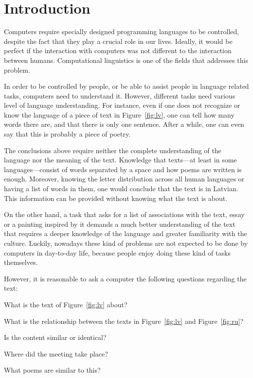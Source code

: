 \chapter{Introduction}
\label{ch:introduction}


Computers require specially designed programming languages to be controlled, despite the fact that they play a crucial role in our lives. Ideally, it would be perfect if the interaction with computers was not different to the interaction between humans. Computational linguistics is one of the fields that addresses this problem.

In order to be controlled by people, or be able to assist people in language related tasks, computers need to understand it. However, different tasks need various level of language understanding. For instance, even if one does not recognize or know the language of a piece of text in Figure~\ref{fig:lv}, one can tell how many words there are, and that there is only one sentence. After a while, one can even say that this is probably a piece of poetry.

The conclusions above require neither the complete understanding of the language nor the meaning of the text. Knowledge that texts---at least in some languages---consist of words separated by a space and how poems are written is enough. Moreover, knowing the letter distribution across all human languages or having a list of words in them, one would conclude that the text is in Latvian. This information can be provided without knowing what the text is about.



On the other hand, a task that asks for a list of associations with the text, essay or a painting inspired by it demands a much better understanding of the text that requires a deeper knowledge of the language and greater familiarity with the culture. Luckily, nowadays these kind of problems are not expected to be done by computers in day-to-day life, because people enjoy doing these kind of tasks themselves.

However, it is reasonable to ask a computer the following questions regarding the text:
\begin{inparaenum}[a)]
\item What is the text of Figure~\ref{fig:lv} about?
\item What is the relationship between the texts in Figure~\ref{fig:lv} and
  Figure~\ref{fig:ru}?
\item Is the content similar or identical?
\item Where did the meeting take place?
\item What poems are similar to this?
\end{inparaenum}

